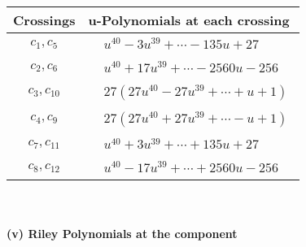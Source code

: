 \documentclass[1p]{elsarticle_modified}
\theoremstyle{definition}
\begin{document}
\begin{tabular}{m{50pt}|m{274pt}}
Crossings & \hspace{64pt}u-Polynomials at each crossing \\
\hline $$\begin{aligned}c_{1},c_{5}\end{aligned}$$&$\begin{aligned}
&u^{40}-3 u^{39}+\cdots-135 u+27
\end{aligned}$\\
\hline $$\begin{aligned}c_{2},c_{6}\end{aligned}$$&$\begin{aligned}
&u^{40}+17 u^{39}+\cdots-2560 u-256
\end{aligned}$\\
\hline $$\begin{aligned}c_{3},c_{10}\end{aligned}$$&$\begin{aligned}
&27(27 u^{40}-27 u^{39}+\cdots+u+1)
\end{aligned}$\\
\hline $$\begin{aligned}c_{4},c_{9}\end{aligned}$$&$\begin{aligned}
&27(27 u^{40}+27 u^{39}+\cdots- u+1)
\end{aligned}$\\
\hline $$\begin{aligned}c_{7},c_{11}\end{aligned}$$&$\begin{aligned}
&u^{40}+3 u^{39}+\cdots+135 u+27
\end{aligned}$\\
\hline $$\begin{aligned}c_{8},c_{12}\end{aligned}$$&$\begin{aligned}
&u^{40}-17 u^{39}+\cdots+2560 u-256
\end{aligned}$\\
\hline
\end{tabular}\\~\\
\newpage\renewcommand{\arraystretch}{1}
\flushleft \textbf{(v) Riley Polynomials at the component}\newline \\
\end{document}
